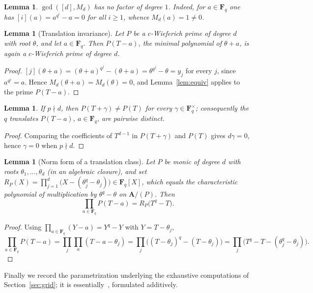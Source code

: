 \documentclass[11pt]{amsart}
\newcommand{\A}{\mathbf{A}}
\newcommand{\F}{\mathbf{F}}
\theoremstyle{plain}
\newtheorem{lemma}[theorem]{Lemma}
\theoremstyle{definition}
\begin{document}
\begin{lemma}\label{lem:nolinear}
$\gcd([d],M_d)$ has no factor of degree $1$. Indeed, for $a\in\F_q$ one has
$[i](a)=a^{q^i}-a=0$ for all $i\ge1$, whence $M_d(a)=1\neq0$.
\end{lemma}

\begin{lemma}[Translation invariance]\label{lem:transl}
Let $P$ be a $c$-Wieferich prime of degree $d$ with root $\theta$, and let
$a\in\F_q$. Then $P(T-a)$, the minimal polynomial of $\theta+a$, is again a
$c$-Wieferich prime of degree $d$.
\end{lemma}

\begin{proof}
$[j](\theta+a)=(\theta+a)^{q^j}-(\theta+a)=\theta^{q^j}-\theta=y_j$ for every
$j$, since $a^{q^j}=a$. Hence $M_d(\theta+a)=M_d(\theta)=0$, and
Lemma~\ref{lem:equiv} applies to the prime $P(T-a)$.
\end{proof}

\begin{lemma}\label{lem:nonfixed}
If $p\nmid d$, then $P(T+\gamma)\neq P(T)$ for every $\gamma\in\F_q^\times$;
consequently the $q$ translates $P(T-a)$, $a\in\F_q$, are pairwise distinct.
\end{lemma}

\begin{proof}
Comparing the coefficients of $T^{d-1}$ in $P(T+\gamma)$ and $P(T)$ gives
$d\gamma=0$, hence $\gamma=0$ when $p\nmid d$.
\end{proof}

\begin{lemma}[Norm form of a translation class]\label{lem:norm}
Let $P$ be monic of degree $d$ with roots $\theta_1,\dots,\theta_d$ (in an
algebraic closure), and set
$R_P(X)=\prod_{j=1}^d\bigl(X-(\theta_j^q-\theta_j)\bigr)\in\F_q[X]$, which equals
the characteristic polynomial of multiplication by $\theta^q-\theta$ on
$\A/(P)$. Then
\[
\prod_{a\in\F_q}P(T-a)=R_P\bigl(T^q-T\bigr).
\]
\end{lemma}

\begin{proof}
Using $\prod_{a\in\F_q}(Y-a)=Y^q-Y$ with $Y=T-\theta_j$,
\[
\prod_{a\in\F_q}P(T-a)=\prod_j\prod_a(T-a-\theta_j)
=\prod_j\bigl((T-\theta_j)^q-(T-\theta_j)\bigr)
=\prod_j\bigl(T^q-T-(\theta_j^q-\theta_j)\bigr).
\]
\end{proof}

Finally we record the parametrization underlying the exhaustive computations of
Section~\ref{sec:grid}; it is essentially~\cite[Thms.~3.3--3.4]{BB}, formulated
additively.
\end{document}
